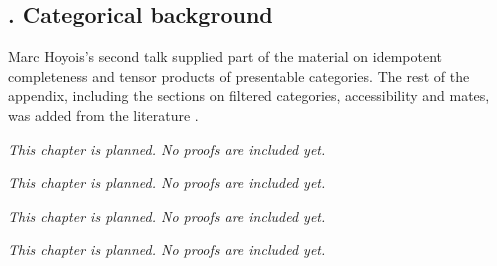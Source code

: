 \documentclass[11pt]{book}
\begin{document}
	\subsection*{. Categorical background}

	Marc Hoyois's second talk supplied part of the material on idempotent completeness and tensor products of presentable categories. The rest of the appendix, including the sections on filtered categories, accessibility and mates, was added from the literature \cite{lurie2009HTT,lurie2016HA,KellyStreet1974Mates,Riehl_Verity}.

	\titlespacing*{\chapter}{0pt}{50pt}{40pt}

	\restoregeometry
	\openany

	\mainmatter
	\pagestyle{plain}
	\setcounter{secnumdepth}{2}
	

	

	

	
	
	

	

	
	\noindent\emph{This chapter is planned. No proofs are included yet.}
	
	\noindent\emph{This chapter is planned. No proofs are included yet.}
	
	\noindent\emph{This chapter is planned. No proofs are included yet.}
	
	\noindent\emph{This chapter is planned. No proofs are included yet.}

	\appendix

	\titleformat{\subsubsection}{\large\bfseries}{}{6pt}{\large}
	\renewcommand{\thechapter}{\Alph{chapter}}
	\renewcommand{\thesection}{\Alph{chapter}.\arabic{section}}
	\renewcommand{\thesubsection}{\Alph{chapter}.\arabic{section}.\arabic{subsection}}
	\renewcommand{\thetheorem}{\Alph{chapter}.\arabic{theorem}}

	

	\printbibliography[heading=bibintoc]
\end{document}
